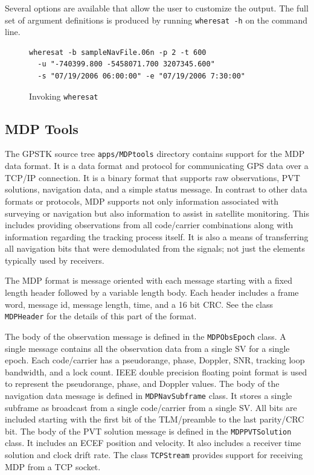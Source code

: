 \documentclass{ion-gps}
\newcommand{\gpstkapplication}[1]{\texttt{#1}}
\newcommand{\gpstkdir}[1]{\texttt{#1}}
\newcommand{\gpstkclass}[1]{\texttt{#1}}
\begin{document}
Several options are available that allow the user to customize the 
output. The full set of argument definitions is produced by 
running \gpstkapplication{wheresat -h} on the command line.


\begin{figure}[htbp]
   \begin{scriptsize}
   \begin{bf}
   \begin{lstlisting}
wheresat -b sampleNavFile.06n -p 2 -t 600
  -u "-740399.800 -5458071.700 3207345.600" 
  -s "07/19/2006 06:00:00" -e "07/19/2006 7:30:00"
   \end{lstlisting}
   \end{bf}
   \end{scriptsize}
  \caption{Invoking \gpstkapplication{wheresat}}
  \label{fig:wheresat}
\end{figure}


\subsection*{MDP Tools}

The GPSTK source tree \gpstkdir{apps/MDPtools} directory contains
support for the MDP data format. It is a
data format and protocol for communicating GPS data over a TCP/IP
connection. It is a binary format that supports raw observations, PVT
solutions, navigation data, and a simple status message. In contrast
to other data formats or protocols, MDP supports not only information
associated with surveying or navigation but also information to
assist in satellite monitoring. This includes providing observations
from all code/carrier combinations along with information regarding
the tracking process itself. It is also a means of transferring all
navigation bits that were demodulated from the signals; not just the
elements typically used by receivers.

The MDP format is message oriented with each message starting with a
fixed length header followed by a variable length body. Each header
includes a frame word, message id, message length, time, and a 16 bit
CRC. See the class \gpstkclass{MDPHeader} for the details of this part
of the format.  

The body of the observation message is defined in the
\gpstkclass{MDPObsEpoch} class.  A single message contains all the
observation data from a single SV for a single epoch. Each
code/carrier has a pseudorange, phase, Doppler, SNR, tracking loop
bandwidth, and a lock count. IEEE double precision floating point
format is used to represent the pseudorange, phase, and Doppler
values. The body of the navigation data message is defined in
\gpstkclass{MDPNavSubframe} class. It stores a single subframe as
broadcast from a single code/carrier from a single SV. All bits are
included starting with the first bit of the TLM/preamble to the last
parity/CRC bit.  The body of the PVT solution message is defined in the
\gpstkclass{MDPPVTSolution} class. It includes an ECEF position and
velocity. It also includes a receiver time solution and clock drift
rate. The class \gpstkclass{TCPStream} provides support for receiving
MDP from a TCP socket.
\end{document}
